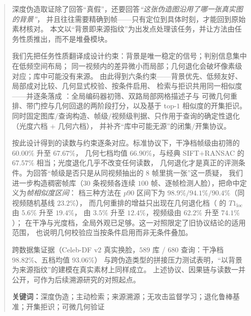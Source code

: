 \begin{abstract}
深度伪造取证除了回答“真假”，还要回答\emph{“这张伪造图沿用了哪一张真实图的背景”}，
并且往往需要精确到帧——只有定位到具体时刻，才能回到原始素材核对。
本文以“背景即来源指纹”为出发点处理该任务，并让方法由任务性质推出，而不是堆叠模块。

我们先把任务性质翻译成设计约束：背景是唯一稳定的信号；判别信息集中在低频空间布局；
同一视频内的差异微小而局部；几何退化会破坏像素级对应；库中可能没有来源。
由此得到六条约束——背景优先、低频友好、局部成对比较、几何显式校验、按条件启用、
检索与拒识共用同一相似度——并逐条落成 \aura{}：全局编码器初筛、双路局部网格描述子与
可微几何重排、带门控与几何回退的两阶段打分，以及基于 top-$1$ 相似度的开集拒识。
同时固定图库$/$查询构造、帧级$/$视频级判据、只作用于查询的确定性退化（光度六档 $+$ 几何六档），
并补齐“库中可能无源”的闭集$/$开集协议。

按此设计得到的读数与约束逐条对应。标准协议下，干净档帧级由初筛的 $60.00\%$ 升至 $67.67\%$，
几何七档均值 $66.90\%$，与经典 SIFT$+$RANSAC 的 $67.57\%$ 相当；光度退化几乎不改变任何读数，
几何退化才是真正的评测条件。为回答“帧级是否只是从同视频抽出的 $8$ 帧里挑一张”这一质疑，
我们进一步构造稠密帧库（$30$ 条视频各连续 $100$ 帧、逐帧检测人脸），把命中定义为\emph{帧相似度区间}：
 档三种方法在 $p90$ 区间下为 $98.9\%/94.1\%/90.4\%$（同视频随机基线 $23.2\%$），
而几何重排的增益只出现在几何退化档（ 的 $T1_{\text{loc}}$ 由 $5.6\%$ 升至 $19.4\%$，
 由 $3.5\%$ 升至 $12.4\%$，视频级由 $62.2\%$ 升至 $74.1\%$）；
在干净与光度档，全局外观已足够。这一对照限定了旧协议结论的适用范围，
也说明几何校验应当按条件启用而非无条件叠加。

跨数据集证据（Celeb-DF v2 真实换脸，$589$ 库 / $680$ 查询：干净档 $98.82\%$、五档均值 $93.06\%$）
与跨伪造类型的拼接压力测试表明，“以背景为来源指纹”的建模在真实素材上同样成立。
上述协议、因果链与读数一并公开，可作为后续溯源研究的对照起点。

\vspace{2mm}
\noindent\textbf{关键词：}深度伪造；主动检索；来源溯源；无攻击监督学习；退化鲁棒基准；开集拒识；可微几何验证
\end{abstract}

\newpage
